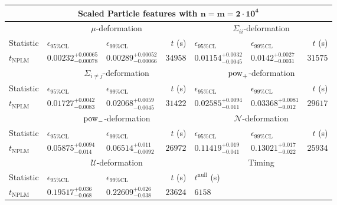 \begin{tabular}{l|llr|llr}
	\toprule
	\multicolumn{7}{c}{{\bf Scaled Particle features with $\mathbf{n=m=2\cdot 10^{4}}$}} \\
	\toprule
	\multicolumn{1}{c}{} & \multicolumn{3}{c}{$\mu$-deformation} & \multicolumn{3}{c}{$\Sigma_{ii}$-deformation} \\
	Statistic & $\epsilon_{95\%\mathrm{CL}}$ & $\epsilon_{99\%\mathrm{CL}}$ & $t$ (s) & $\epsilon_{95\%\mathrm{CL}}$ & $\epsilon_{99\%\mathrm{CL}}$ & $t$ (s) \\
	\midrule
	$t_{\mathrm{NPLM}}$ & $0.00232_{-0.00078}^{+0.00065}$ & $0.00289_{-0.00066}^{+0.00052}$ & $34958$ & $0.01154_{-0.0045}^{+0.0032}$ & $0.0142_{-0.0031}^{+0.0027}$ & $31575$ \\
	\toprule
	\multicolumn{1}{c}{} & \multicolumn{3}{c}{$\Sigma_{i\neq j}$-deformation} & \multicolumn{3}{c}{$\rm{pow}_{+}$-deformation} \\
	Statistic & $\epsilon_{95\%\mathrm{CL}}$ & $\epsilon_{99\%\mathrm{CL}}$ & $t$ (s) & $\epsilon_{95\%\mathrm{CL}}$ & $\epsilon_{99\%\mathrm{CL}}$ & $t$ (s) \\
	\midrule
	$t_{\mathrm{NPLM}}$ & $0.01727_{-0.0083}^{+0.0042}$ & $0.02068_{-0.0045}^{+0.0059}$ & $31422$ & $0.02585_{-0.011}^{+0.0094}$ & $0.03368_{-0.012}^{+0.0081}$ & $29617$ \\
	\toprule
	\multicolumn{1}{c}{} & \multicolumn{3}{c}{$\rm{pow}_{-}$-deformation} & \multicolumn{3}{c}{$\mathcal{N}$-deformation} \\
	Statistic & $\epsilon_{95\%\mathrm{CL}}$ & $\epsilon_{99\%\mathrm{CL}}$ & $t$ (s) & $\epsilon_{95\%\mathrm{CL}}$ & $\epsilon_{99\%\mathrm{CL}}$ & $t$ (s) \\
	\midrule
	$t_{\mathrm{NPLM}}$ & $0.05875_{-0.014}^{+0.0094}$ & $0.06514_{-0.0092}^{+0.011}$ & $26972$ & $0.11419_{-0.041}^{+0.019}$ & $0.13021_{-0.022}^{+0.017}$ & $25934$ \\
	\toprule
	\multicolumn{1}{c}{} & \multicolumn{3}{c}{$\mathcal{U}$-deformation} & \multicolumn{3}{c}{Timing} \\
	Statistic & $\epsilon_{95\%\mathrm{CL}}$ & $\epsilon_{99\%\mathrm{CL}}$ & $t$ (s) & $t^{\mathrm{null}}$ (s) \\
	\midrule
	$t_{\mathrm{NPLM}}$ & $0.19517_{-0.068}^{+0.036}$ & $0.22609_{-0.038}^{+0.026}$ & $23624$ & $6158$ \\
	\bottomrule
\end{tabular}